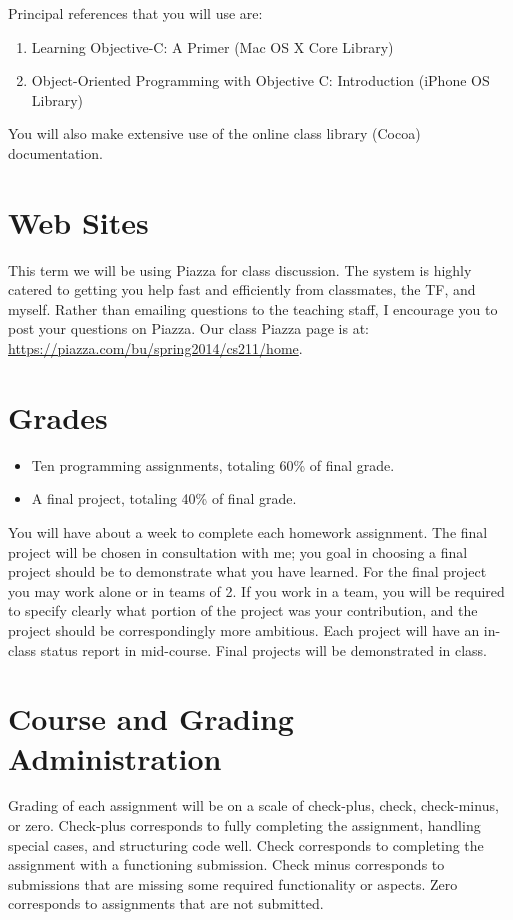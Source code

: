 \documentclass[11pt]{article}
\begin{document}
Principal references that you will use are:
\begin{enumerate}
\item Learning Objective-C: A Primer (Mac OS X Core Library)
\item Object-Oriented Programming with Objective C: Introduction (iPhone OS Library)
\end{enumerate}

You will also make extensive use of the online class library (Cocoa) documentation.

\section*{Web Sites} 

This term we will be using Piazza for class discussion. The system is highly catered to getting you help fast and efficiently from classmates, the TF, and myself. Rather than emailing questions to the teaching staff, I encourage you to post your questions on Piazza.   Our class Piazza page  is at: \url{https://piazza.com/bu/spring2014/cs211/home}.

\section*{Grades}
\begin{itemize}
\item Ten programming assignments, totaling 60\% of final grade.
\item A final project, totaling 40\% of final grade.
\end{itemize}

You will have about a week to complete each homework assignment.  The final
project will be chosen in consultation with me;  you goal in choosing a
final project should be to demonstrate what you have learned.    For the
final project you may work alone or in teams of 2.   If you work in a
team, you will be required to specify clearly what portion of the
project was your contribution, and the project should be correspondingly
more ambitious.    Each project will have an in-class status report in
mid-course.  Final projects will be demonstrated in class.

\section*{Course and Grading Administration}

Grading of each assignment will be on a scale of check-plus, check,
check-minus, or zero.    Check-plus corresponds to fully completing the
assignment, handling special cases, and structuring code well.   Check
corresponds to completing the assignment with a functioning submission.
Check minus corresponds to submissions that are missing some required
functionality or aspects.   Zero corresponds to assignments that are not
submitted.
\end{document}
